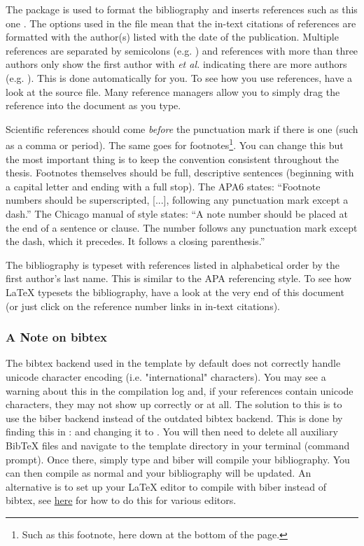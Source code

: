 The  package is used to format the bibliography and inserts references such as this one \parencite{Reference4}. The options used in the  file mean that the in-text citations of references are formatted with the author(s) listed with the date of the publication. Multiple references are separated by semicolons (e.g. \parencite{Reference2, Reference1}) and references with more than three authors only show the first author with \emph{et al.} indicating there are more authors (e.g. \parencite{Reference3}). This is done automatically for you. To see how you use references, have a look at the  source file. Many reference managers allow you to simply drag the reference into the document as you type.

Scientific references should come \emph{before} the punctuation mark if there is one (such as a comma or period). The same goes for footnotes\footnote{Such as this footnote, here down at the bottom of the page.}. You can change this but the most important thing is to keep the convention consistent throughout the thesis. Footnotes themselves should be full, descriptive sentences (beginning with a capital letter and ending with a full stop). The APA6 states: \enquote{Footnote numbers should be superscripted, [...], following any punctuation mark except a dash.} The Chicago manual of style states: \enquote{A note number should be placed at the end of a sentence or clause. The number follows any punctuation mark except the dash, which it precedes. It follows a closing parenthesis.}

The bibliography is typeset with references listed in alphabetical order by the first author's last name. This is similar to the APA referencing style. To see how \LaTeX{} typesets the bibliography, have a look at the very end of this document (or just click on the reference number links in in-text citations).

\subsubsection{A Note on bibtex}

The bibtex backend used in the template by default does not correctly handle unicode character encoding (i.e. "international" characters). You may see a warning about this in the compilation log and, if your references contain unicode characters, they may not show up correctly or at all. The solution to this is to use the biber backend instead of the outdated bibtex backend. This is done by finding this in :  and changing it to . You will then need to delete all auxiliary BibTeX files and navigate to the template directory in your terminal (command prompt). Once there, simply type  and biber will compile your bibliography. You can then compile  as normal and your bibliography will be updated. An alternative is to set up your LaTeX editor to compile with biber instead of bibtex, see \href{http://tex.stackexchange.com/questions/154751/biblatex-with-biber-configuring-my-editor-to-avoid-undefined-citations/}{here} for how to do this for various editors.

